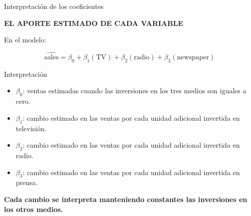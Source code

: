 \documentclass[aspectratio=169,11pt]{beamer}
\newcommand{\kicker}[1]{%
  {\scriptsize\bfseries\color{cAcc}\MakeUppercase{#1}}%
  \par\vspace{0.2em}%
}
\newcommand{\destaca}[1]{%
  {\color{cPrim}\bfseries #1}%
}
\newenvironment{cerrado}[1]
  {\begin{block}{#1}
   \begin{minipage}{\linewidth}
   \raggedright}
  {\end{minipage}
   \end{block}}
\begin{document}
\begin{frame}{Interpretación de los coeficientes}

  \begin{center}
    \begin{minipage}{0.90\textwidth}

      \small

      \kicker{EL APORTE ESTIMADO DE CADA VARIABLE}

      En el modelo:

      \vspace{-0.3em}

      \[
        \widehat{\text{sales}}
        =
        \beta_0
        + \beta_1(\text{TV})
        + \beta_2(\text{radio})
        + \beta_3(\text{newspaper})
      \]

      \vspace{-0.4em}

      \begin{cerrado}{Interpretación}

        \begin{itemize}
          \setlength{\itemsep}{0.3em}

          \item \(\beta_0\): ventas estimadas cuando las inversiones
                en los tres medios son iguales a cero.

          \item \(\beta_1\): cambio estimado en las ventas por cada
                unidad adicional invertida en televisión.

          \item \(\beta_2\): cambio estimado en las ventas por cada
                unidad adicional invertida en radio.

          \item \(\beta_3\): cambio estimado en las ventas por cada
                unidad adicional invertida en prensa.

        \end{itemize}

      \end{cerrado}

      \vspace{0.3em}

      \begin{center}
        \destaca{Cada cambio se interpreta manteniendo constantes
        las inversiones en los otros medios.}
      \end{center}

    \end{minipage}
  \end{center}

\end{frame}
\end{document}
